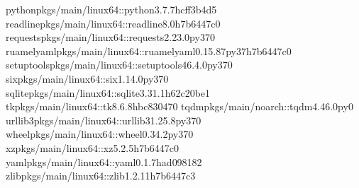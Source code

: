 \documentclass[a4paper,10pt,english]{sphinxmanual}
\begin{document}
\begin{sphinxVerbatim}[commandchars=\\\{\}]
pythonpkgs/main/linux\PYGZhy{}64::python\PYGZhy{}3.7.7\PYGZhy{}hcff3b4d\PYGZus{}5
readlinepkgs/main/linux\PYGZhy{}64::readline\PYGZhy{}8.0\PYGZhy{}h7b6447c\PYGZus{}0
requestspkgs/main/linux\PYGZhy{}64::requests\PYGZhy{}2.23.0\PYGZhy{}py37\PYGZus{}0
ruamel\PYGZus{}yamlpkgs/main/linux\PYGZhy{}64::ruamel\PYGZus{}yaml\PYGZhy{}0.15.87\PYGZhy{}py37h7b6447c\PYGZus{}0
setuptoolspkgs/main/linux\PYGZhy{}64::setuptools\PYGZhy{}46.4.0\PYGZhy{}py37\PYGZus{}0
sixpkgs/main/linux\PYGZhy{}64::six\PYGZhy{}1.14.0\PYGZhy{}py37\PYGZus{}0
sqlitepkgs/main/linux\PYGZhy{}64::sqlite\PYGZhy{}3.31.1\PYGZhy{}h62c20be\PYGZus{}1
tkpkgs/main/linux\PYGZhy{}64::tk\PYGZhy{}8.6.8\PYGZhy{}hbc83047\PYGZus{}0
tqdmpkgs/main/noarch::tqdm\PYGZhy{}4.46.0\PYGZhy{}py\PYGZus{}0
urllib3pkgs/main/linux\PYGZhy{}64::urllib3\PYGZhy{}1.25.8\PYGZhy{}py37\PYGZus{}0
wheelpkgs/main/linux\PYGZhy{}64::wheel\PYGZhy{}0.34.2\PYGZhy{}py37\PYGZus{}0
xzpkgs/main/linux\PYGZhy{}64::xz\PYGZhy{}5.2.5\PYGZhy{}h7b6447c\PYGZus{}0
yamlpkgs/main/linux\PYGZhy{}64::yaml\PYGZhy{}0.1.7\PYGZhy{}had09818\PYGZus{}2
zlibpkgs/main/linux\PYGZhy{}64::zlib\PYGZhy{}1.2.11\PYGZhy{}h7b6447c\PYGZus{}3



\end{sphinxVerbatim}
\end{document}
